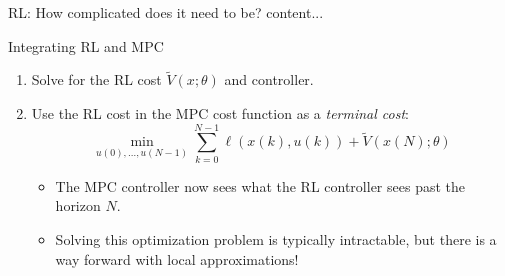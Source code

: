 \documentclass[xcolor=dvipsnames,aspectratio=169]{beamer}
\begin{document}
\begin{frame}{RL: How complicated does it need to be?}
	content...
\end{frame}

\begin{frame}{Integrating RL and MPC}
	\begin{enumerate}
		\item Solve for the RL cost $\tilde{V}(x;\theta)$ and controller.
		\item Use the RL cost in the MPC cost function as a \textit{terminal 
		cost}: 
		\begin{equation*}
			\min_{u(0),\dots,u(N-1)} \sum_{k=0}^{N-1} \ell(x(k),u(k)) + 
			\tilde{V}(x(N);\theta)
		\end{equation*}
		\begin{itemize}
			\item The MPC controller now sees what the RL controller sees past 
			the horizon $N$. 
			\item Solving this optimization problem is typically intractable, 
			but there is a way forward with local approximations!
		\end{itemize} 
	\end{enumerate}
\end{frame}
\end{document}
